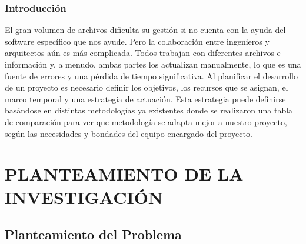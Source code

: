 \documentclass[12pt,a4paper,oneside]{article}
\begin{document}
\newpage


\subsubsection*{\centering Introducción}
El gran volumen de archivos dificulta su gestión si no cuenta con la ayuda del software específico que nos ayude. Pero la colaboración entre ingenieros y arquitectos aún es más complicada. Todos trabajan con diferentes archivos e información y, a menudo, ambas partes los actualizan manualmente, lo que es una fuente de errores y una pérdida de tiempo significativa. Al planificar el desarrollo de un proyecto es necesario definir los objetivos, los recursos que se asignan, el marco temporal y una estrategia de actuación. Esta estrategia puede definirse basándose en distintas metodologías ya existentes donde se realizaron una tabla de comparación para ver que metodología se adapta mejor a nuestro proyecto, según las necesidades y bondades del equipo encargado del proyecto.
\newpage


\tableofcontents
\newpage

\section{PLANTEAMIENTO DE LA INVESTIGACIÓN}
\subsection{Planteamiento del Problema}
\end{document}
